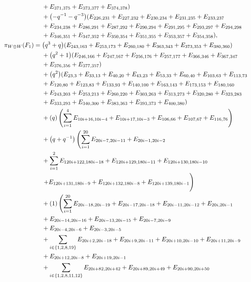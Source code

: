 \documentclass[pdftex]{sigma}
\numberwithin{equation}{section}
\theoremstyle{definition}
\begin{document}
\begin{align*}
&+E_{371,375}+E_{373,377}+E_{374,378})\\
&+\bigl(-q^{-1} - q^{-3}\bigr)(E_{226,231}+E_{227,232}+E_{230,234}+E_{231,235}+E_{233,237}\\
&+E_{234,238}+E_{286,291}+E_{287,292}+E_{290,294}+E_{291,295}+E_{293,297}+E_{294,298}\\
&+E_{346,351}+E_{347,352}+E_{350,354}+E_{351,355}+E_{353,357}+E_{354,358}),
\\
 \pi_{W \otimes W}(F_1) ={}
&\bigl(q^3 + q\bigr)(E_{243,163}+E_{253,173}+E_{260,180}+E_{363,343}+E_{373,353}+E_{380,360})\\
&+\bigl(q^2 + 1\bigr)(E_{246,166}+E_{247,167}+E_{256,176}+E_{257,177}+E_{366,346}+E_{367,347}\\
&+E_{376,356}+E_{377,357})\\
&+\bigl(q^2\bigr)(E_{23,3}+E_{33,13}+E_{40,20}+E_{43,23}+E_{53,33}+E_{60,40}+E_{103,63}+E_{113,73}\\
&+E_{120,80}+E_{123,83}+E_{133,93}+E_{140,100}+E_{163,143}+E_{173,153}+E_{180,160}\\
&+E_{243,203}+E_{253,213}+E_{260,220}+E_{303,263}+E_{313,273}+E_{320,280}+E_{323,283}\\
&+E_{333,293}+E_{340,300}+E_{383,363}+E_{393,373}+E_{400,380})\\
&+(q)\left(\sum_{i=1}^{4} E_{10i+16,10i-4} + E_{10i+17,10i-3} + E_{106,66} + E_{107,67} + E_{116,76} \vphantom{\sum_{i=1}^4}\right) \\
&+\bigl(q + q^{-1}\bigr)\left(\sum_{i=1}^{20} E_{20i-7,20i-11} + E_{20i-1,20i-2} \right. \\
&+ \sum_{i=1}^2 E_{120i+122,180i-18} + E_{120i+129,180i-11} + E_{120i+130,180i-10} \\
&\left. + E_{120i+131,180i-9} + E_{120i+132,180i-8} + E_{120i+139,180i-1} \vphantom{\sum_{i=1}^{20}}\right) \\
&+(1)\left(\sum_{i=1}^{20} E_{20i-18,20i-19} + E_{20i-17,20i-18} + E_{20i-11,20i-12} +E_{20i,20i-1} \right. \\
&+ E_{20i-14,20i-16}+ E_{20i-13,20i-15} + E_{20i-7,20i-9}\\& + E_{20i-4,20i-6} + E_{20i-3,20i-5} \\
&+ \sum_{i \in \{1,2,8,19\}} E_{20i+2,20i-18} + E_{20i+9,20i-11} + E_{20i+10,20i-10} + E_{20i+11,20i-9}\\
& + E_{20i+12,20i-8} + E_{20i+19,20i-1} \\
&+ \sum_{i \in \{1,2,8,11,12\}} E_{20i+82,20i+42} + E_{20i+89,20i+49} + E_{20i+90,20i+50} \\

\end{align*}
\end{document}

